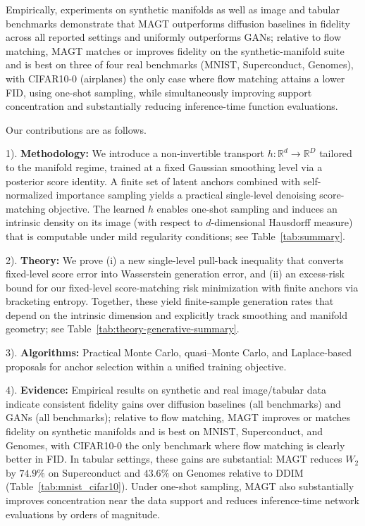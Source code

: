 \documentclass[12pt]{article}
\theoremstyle{definition} %
\providecommand{\method}{MAGT} %
\begin{document}
Empirically, experiments on synthetic manifolds as well as image and tabular benchmarks demonstrate that \method{} outperforms diffusion baselines in fidelity across all reported settings and uniformly outperforms GANs; relative to flow matching, \method{} matches or improves fidelity on the synthetic-manifold suite and is best on three of four real benchmarks (MNIST, Superconduct, Genomes), with CIFAR10-0 (airplanes) the only case where flow matching attains a lower FID, using one-shot sampling, while simultaneously improving support concentration and substantially reducing inference-time function evaluations.

 Our contributions are as follows.

1). \textbf{Methodology:} We introduce a non-invertible transport $h:\mathbb{R}^{d}\to\mathbb{R}^{D}$ tailored to the manifold regime, trained at a fixed Gaussian smoothing level via a posterior score identity. A finite set of latent anchors combined with self-normalized importance sampling yields a practical single-level denoising score-matching objective. The learned $h$ enables one-shot sampling and induces an intrinsic density on its image (with respect to $d$-dimensional Hausdorff measure) that is computable under mild regularity conditions; see Table~\ref{tab:summary}.

2). \textbf{Theory:} We prove (i) a new single-level pull-back inequality that converts fixed-level score error into Wasserstein generation error, and (ii) an excess-risk bound for our fixed-level score-matching risk minimization with finite anchors via bracketing entropy. Together, these yield finite-sample generation rates that depend on the intrinsic dimension and explicitly track smoothing and manifold geometry; see Table~\ref{tab:theory-generative-summary}.

3). \textbf{Algorithms:} Practical Monte Carlo, quasi--Monte Carlo, and Laplace-based proposals for anchor selection within a unified training objective.

4). \textbf{Evidence:} Empirical results on synthetic and real image/tabular data indicate consistent fidelity gains over diffusion baselines (all benchmarks) and GANs (all benchmarks); relative to flow matching, \method{} improves or matches fidelity on synthetic manifolds and is best on MNIST, Superconduct, and Genomes, with CIFAR10-0 the only benchmark where flow matching is clearly better in FID. In tabular settings, these gains are substantial: \method{} reduces $W_2$ by $74.9\%$ on Superconduct and $43.6\%$ on Genomes relative to DDIM (Table~\ref{tab:mnist_cifar10}). Under one-shot sampling, \method{} also substantially improves concentration near the data support and reduces inference-time network evaluations by orders of magnitude.
\end{document}
